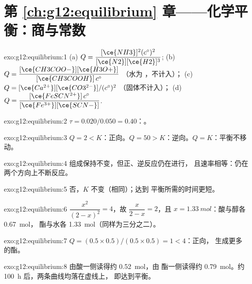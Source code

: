 \section*{第 \ref{ch:g12:equilibrium} 章——化学平衡：商与常数}

\begin{solution}{exo:g12:equilibrium:1}
(a) $Q = \dfrac{[\ce{NH3}]^2 (c^\circ)^2}{[\ce{N2}][\ce{H2}]^3}$;
(b) $Q = \dfrac{[\ce{CH3COO-}][\ce{H3O+}]}{[\ce{CH3COOH}]\,c^\circ}$ （水为
，不计入）；
(c) $Q = [\ce{Ca^{2+}}][\ce{CO3^{2-}}]/(c^\circ)^2$ （固体不计入）；
(d) $Q = \dfrac{[\ce{FeSCN^{2+}}]\,c^\circ}{[\ce{Fe^{3+}}][\ce{SCN-}]}$.
\end{solution}

\begin{solution}{exo:g12:equilibrium:2}
$\tau = 0.020/0.050 = 0.40$：。
\end{solution}

\begin{solution}{exo:g12:equilibrium:3}
$Q = 2 < K$：正向。$Q = 50 > K$：逆向。$Q = K$：平衡不移动。
\end{solution}

\begin{solution}{exo:g12:equilibrium:4}
组成保持不变，但正、逆反应仍在进行，
且速率相等：仍在两个方向上不断反应。
\end{solution}

\begin{solution}{exo:g12:equilibrium:5}
否，$K$ 不变（相同）；达到
平衡所需的时间更短。
\end{solution}

\begin{solution}{exo:g12:equilibrium:6}
$\dfrac{x^2}{(2-x)^2} = 4$，故 $\dfrac{x}{2-x} = 2$，且
$x = \qty{1.33}{mol}$：酸与醇各 \qty{0.67}{mol}，
酯与水各 \qty{1.33}{mol}（同样为三分之二）。
\end{solution}

\begin{solution}{exo:g12:equilibrium:7}
$Q = (0.5 \times 0.5)/(0.5 \times 0.5) = 1 < 4$：正向，
生成更多的酯。
\end{solution}

\begin{solution}{exo:g12:equilibrium:8}
由酸一侧读得约 \qty{0.52}{mol}，由
酯一侧读得约 \qty{0.79}{mol}。约 \qty{100}{h} 后，两条曲线均落在虚线上，
即达到平衡。
\end{solution}

